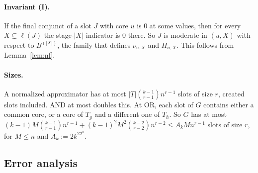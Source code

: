 \documentclass[11pt,a4paper]{article}
\theoremstyle{plain}
\theoremstyle{definition}
\theoremstyle{remark}
\begin{document}
\paragraph{Invariant (I).} If the final conjunct of a slot $J$ with core $u$ is 0 at some values, then for every
$X\subsetneq\ell(J)$ the stage-$|X|$ indicator is 0 there. So $J$ is moderate in $(u,X)$ with respect to
$B^{(|X|)}$, the family that defines $\nu_{u,X}$ and $H_{u,X}$. This follows from Lemma~\ref{lem:nf}.

\paragraph{Sizes.} A normalized approximator has at most $|T|\binom{k-1}{r-1}n^{r-1}$ slots of size $r$, created slots
included. AND at most doubles this. At OR, each slot of $G$ contains either a common core, or a core of $T_g$ and a
different one of $T_h$. So $G$ has at most $(k-1)M\binom{k-1}{r-1}n^{r-1}+(k-1)^2M^2\binom{k-2}{r-2}n^{r-2}\le
A_kMn^{r-1}$ slots of size $r$, for $M\le n$ and $A_k:=2k^22^k$.

\subsection{Error analysis}
\end{document}
